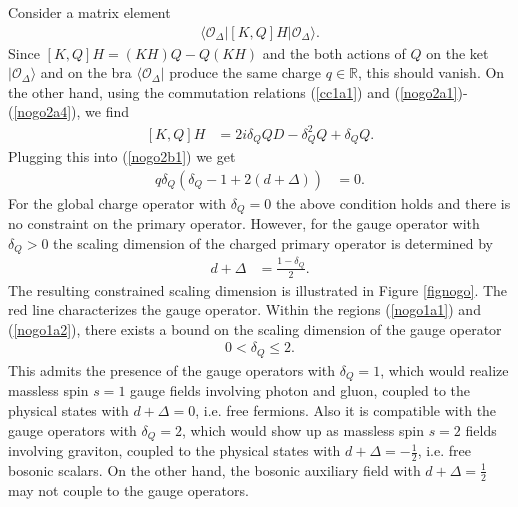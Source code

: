 \documentclass[12pt]{article}
\numberwithin{equation}{section}
\begin{document}
Consider a matrix element
\begin{align}
\label{nogo2b1}
\langle \mathcal{O}_{\Delta}|[K,Q]H|\mathcal{O}_{\Delta}\rangle. 
\end{align}
Since $[K,Q]H=(KH)Q-Q(KH)$ and 
the both actions of $Q$ on the ket $|\mathcal{O}_{\Delta}\rangle$ 
and on the bra $\langle \mathcal{O}_{\Delta}|$ produce the same charge $q\in \mathbb{R}$, 
this should vanish. 
On the other hand, using the commutation relations 
(\ref{cc1a1}) and (\ref{nogo2a1})-(\ref{nogo2a4}), 
we find 
\begin{align}
\label{nogo2b2a}
[K,Q]H&=2i\delta_{Q}QD-\delta_{Q}^{2}Q+\delta_{Q}Q. 
\end{align}
Plugging this into (\ref{nogo2b1}) we get 
\begin{align}
\label{nogo2b2}
q\delta_{Q}\left(
\delta_{Q}-1+2(d+\Delta)
\right)&=0.
\end{align}
For the global charge operator with $\delta_{Q}=0$ 
the above condition holds and there is no constraint on the primary operator. 
However, for the gauge operator with $\delta_{Q}>0$ 
the scaling dimension of the charged primary operator is determined by 
\begin{align}
\label{nogo2c3}
d+\Delta&=\frac{1-\delta_{Q}}{2}. 
\end{align} 
The resulting constrained scaling dimension is illustrated in 
Figure \ref{fignogo}. 
The red line characterizes the gauge operator. 
Within the regions (\ref{nogo1a1}) and (\ref{nogo1a2}), 
there exists a bound on the scaling dimension of the gauge operator 
\begin{align}
\label{nogo2c4}
0< \delta_{Q}\le 2. 
\end{align}
This admits the presence of 
the gauge operators with $\delta_{Q}=1$, 
which would realize massless spin $s=1$ gauge fields involving photon and gluon, 
coupled to the physical states with $d+\Delta =0$, i.e. free fermions. 
Also it is compatible with the gauge operators with $\delta_{Q}=2$, 
which would show up as massless spin $s=2$ fields involving graviton, 
coupled to the physical states with $d+\Delta=-\frac12$, i.e. free bosonic scalars. 
On the other hand, the bosonic auxiliary field with $d+\Delta=\frac12$ 
may not couple to the gauge operators. 
\end{document}
